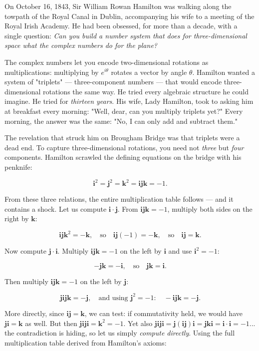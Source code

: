\documentclass[11pt,openright,twoside]{book}
\theoremstyle{definition}
\begin{document}
On October 16, 1843, Sir William Rowan Hamilton was walking along the towpath of the Royal Canal in Dublin, accompanying his wife to a meeting of the Royal Irish Academy. He had been obsessed, for more than a decade, with a single question: \textit{Can you build a number system that does for three-dimensional space what the complex numbers do for the plane?}

The complex numbers let you encode two-dimensional rotations as multiplications: multiplying by $e^{i\theta}$ rotates a vector by angle $\theta$. Hamilton wanted a system of "triplets" --- three-component numbers --- that would encode three-dimensional rotations the same way. He tried every algebraic structure he could imagine. He tried for \textit{thirteen years}. His wife, Lady Hamilton, took to asking him at breakfast every morning: "Well, dear, can you multiply triplets yet?" Every morning, the answer was the same: "No, I can only add and subtract them."

The revelation that struck him on Brougham Bridge was that triplets were a dead end. To capture three-dimensional rotations, you need not \textit{three} but \textit{four} components. Hamilton scrawled the defining equations on the bridge with his penknife:

\[\mathbf{i}^2 = \mathbf{j}^2 = \mathbf{k}^2 = \mathbf{i}\mathbf{j}\mathbf{k} = -1.\]

From these three relations, the entire multiplication table follows --- and it contains a shock. Let us compute $\mathbf{i} \cdot \mathbf{j}$. From $\mathbf{i}\mathbf{j}\mathbf{k} = -1$, multiply both sides on the right by $\mathbf{k}$:

\[\mathbf{i}\mathbf{j}\mathbf{k}^2 = -\mathbf{k}, \quad \text{so} \quad \mathbf{i}\mathbf{j}(-1) = -\mathbf{k}, \quad \text{so} \quad \mathbf{i}\mathbf{j} = \mathbf{k}.\]

Now compute $\mathbf{j} \cdot \mathbf{i}$. Multiply $\mathbf{i}\mathbf{j}\mathbf{k} = -1$ on the left by $\mathbf{i}$ and use $\mathbf{i}^2 = -1$:

\[-\mathbf{j}\mathbf{k} = -\mathbf{i}, \quad \text{so} \quad \mathbf{j}\mathbf{k} = \mathbf{i}.\]

Then multiply $\mathbf{i}\mathbf{j}\mathbf{k} = -1$ on the left by $\mathbf{j}$:

\[\mathbf{j}\mathbf{i}\mathbf{j}\mathbf{k} = -\mathbf{j}, \quad \text{and using } \mathbf{j}^2 = -1: \quad -\mathbf{i}\mathbf{j}\mathbf{k} = -\mathbf{j}.\]

More directly, since $\mathbf{i}\mathbf{j} = \mathbf{k}$, we can test: if commutativity held, we would have $\mathbf{j}\mathbf{i} = \mathbf{k}$ as well. But then $\mathbf{j}\mathbf{i}\mathbf{j}\mathbf{i} = \mathbf{k}^2 = -1$. Yet also $\mathbf{j}\mathbf{i}\mathbf{j}\mathbf{i} = \mathbf{j}(\mathbf{i}\mathbf{j})\mathbf{i} = \mathbf{j}\mathbf{k}\mathbf{i} = \mathbf{i} \cdot \mathbf{i} = -1$... the contradiction is hiding, so let us simply \textit{compute directly}. Using the full multiplication table derived from Hamilton's axioms:
\end{document}
